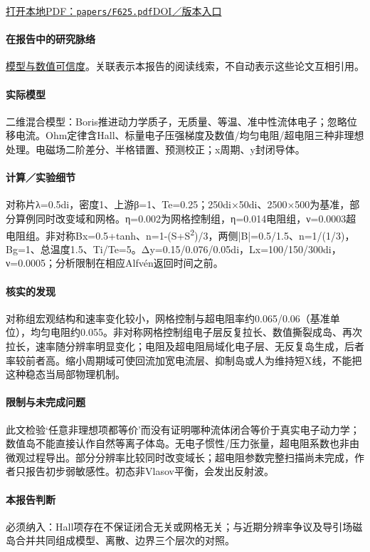 \href{run:papers/F625.pdf}{打开本地PDF：\texttt{papers/F625.pdf}}\quad\href{https://doi.org/10.1063/1.4795727}{DOI／版本入口}

\paragraph{在报告中的研究脉络}\hyperref[ch:numerics]{模型与数值可信度}。关联表示本报告的阅读线索，不自动表示这些论文互相引用。

\paragraph{实际模型}二维混合模型：Boris推进动力学质子，无质量、等温、准中性流体电子；忽略位移电流。Ohm定律含Hall、标量电子压强梯度及数值/均匀电阻/超电阻三种非理想处理。电磁场二阶差分、半格错置、预测校正；x周期、y封闭导体。

\paragraph{计算／实验细节}对称片λ=0.5di，密度1、上游β=1、Te=0.25；250di×50di、2500×500为基准，部分算例同时改变域和网格。η=0.002为网格控制组，η=0.014电阻组，ν=0.0003超电阻组。非对称Bx=0.5+tanh、n=1-(S+S\textsuperscript{2})/3，两侧|B|=0.5/1.5、n=1/(1/3)，Bg=1、总温度1.5、Ti/Te=5。Δy=0.15/0.076/0.05di，Lx=100/150/300di，ν=0.0005；分析限制在相应Alfvén返回时间之前。

\paragraph{核实的发现}对称组宏观结构和速率变化较小，网格控制与超电阻率约0.065/0.06（基准单位），均匀电阻约0.055。非对称网格控制组电子层反复拉长、数值撕裂成岛、再次拉长，速率随分辨率明显变化；电阻及超电阻局域化电子层、无反复岛生成，后者率较前者高。缩小周期域可使回流加宽电流层、抑制岛或人为维持短X线，不能把这种稳态当局部物理机制。

\paragraph{限制与未完成问题}此文检验‘任意非理想项都等价’而没有证明哪种流体闭合等价于真实电子动力学；数值岛不能直接认作自然等离子体岛。无电子惯性/压力张量，超电阻系数也非由微观过程导出。部分分辨率比较同时改变域长；超电阻参数完整扫描尚未完成，作者只报告初步弱敏感性。初态非Vlasov平衡，会发出反射波。

\paragraph{本报告判断}必须纳入：Hall项存在不保证闭合无关或网格无关；与近期分辨率争议及导引场磁岛合并共同组成模型、离散、边界三个层次的对照。

